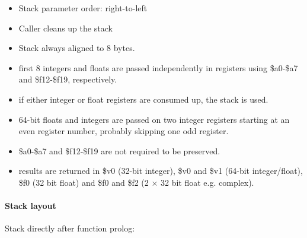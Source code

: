 \begin{itemize}
\item Stack parameter order: right-to-left
\item Caller cleans up the stack
\item Stack always aligned to 8 bytes.
\item first 8 integers and floats are passed independently in registers using \$a0-\$a7 and \$f12-\$f19, respectively.
\item if either integer or float registers are consumed up, the stack is used.
\item 64-bit floats and integers are passed on two integer registers starting at an even register number, probably skipping one odd register.
\item \$a0-\$a7 and \$f12-\$f19 are not required to be preserved.
\item results are returned in \$v0 (32-bit integer), \$v0 and \$v1 (64-bit integer/float), \$f0 (32 bit float) and \$f0 and \$f2 (2 $\times$ 32 bit float e.g. complex).
\end{itemize}

\paragraph{Stack layout}

Stack directly after function prolog:\\

